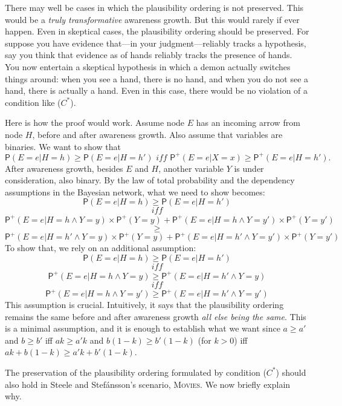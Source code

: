 \documentclass[
  11pt,
  dvipsnames,enabledeprecatedfontcommands]{scrartcl}
\newcommand{\pr}[1]{\ensuremath{\mathsf{P}(#1)}}
\newcommand{\ppr}[2]{\ensuremath{\mathsf{P}^{#1}(#2)}}
\begin{document}
There may well be cases in which the plausibility ordering is not
preserved. This would be a \textit{truly transformative} awareness
growth. But this would rarely if ever happen. Even in skeptical cases,
the plausibility ordering should be preserved. For suppose you have
evidence that---in your judgment---reliably tracks a hypothesis, say you
think that evidence as of hands reliably tracks the presence of hands.
You now entertain a skeptical hypothesis in which a demon actually
switches things around: when you see a hand, there is no hand, and when
you do not see a hand, there is actually a hand. Even in this case,
there would be no violation of a condition like (\(C^*\)).

Here is how the proof would work. Assume node \(E\) has an incoming
arrow from node \(H\), before and after awareness growth. Also assume
that variables are binaries. We want to show that
\[\pr{E=e \vert H=h} \geq \pr{E=e \vert H=h'} \textit{ iff } \ppr{+}{E=e \vert X=x} \geq \ppr{+}{E=e \vert H=h'}.\]
After awareness growth, besides \(E\) and \(H\), another variable \(Y\)
is under consideration, also binary. By the law of total probability and
the dependency assumptions in the Bayesian network, what we need to show
becomes: \[\pr{E=e \vert H=h} \geq \pr{E=e \vert H=h'}\]
\[\textit{ iff }\]
\[\ppr{+}{E=e \vert H=h \wedge Y=y}\times \ppr{+}{Y=y} + \ppr{+}{E=e \vert H=h \wedge Y=y'}\times \ppr{+}{Y=y'} \]
\[\geq\]
\[\ppr{+}{E=e \vert H=h' \wedge Y=y}\times \ppr{+}{Y=y} + \ppr{+}{E=e \vert H=h' \wedge Y=y'}\times \ppr{+}{Y=y'} \]
To show that, we rely on an additional assumption:
\[\pr{E=e \vert H=h} \geq \pr{E=e \vert H=h'} \] \[\textit{ iff }\]
\[\ppr{+}{E=e \vert H=h \wedge Y=y} \geq \ppr{+}{E=e \vert H=h' \wedge Y=y} \]
\[\textit{ iff }\]
\[\ppr{+}{E=e \vert H=h \wedge Y=y'} \geq \ppr{+}{E=e \vert H=h' \wedge Y=y'}\]
This assumption is crucial. Intuitively, it says that the plausibility
ordering remains the same before and after awareness growth
\textit{all else being the same}. This is a minimal assumption, and it
is enough to establish what we want since \(a \geq a'\) and \(b\geq b'\)
iff \(ak \geq a'k\) and \(b(1-k)\geq b'(1-k)\) (for \(k>0\)) iff
\(ak+b(1-k) \geq a'k+b'(1-k)\).

The preservation of the plausibility ordering formulated by condition
(\(C^*\)) should also hold in Steele and Stefánsson's scenario,
\textsc{Movies}. We now briefly explain why.
\end{document}
